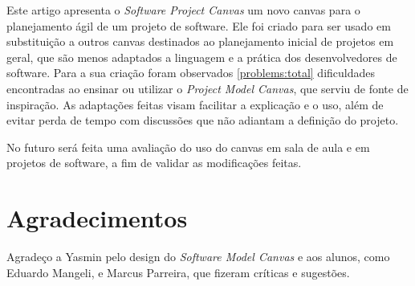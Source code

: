 \documentclass{article}
\begin{document}
Este artigo apresenta o \textit{Software Project Canvas} um novo canvas para o planejamento ágil de um projeto de software. Ele foi criado para ser usado em substituição a outros canvas destinados ao planejamento inicial de projetos em geral, que são menos adaptados a linguagem e a prática dos desenvolvedores de software. Para a sua  criação foram observados \ref{problems:total} dificuldades encontradas ao ensinar ou utilizar o \textit{Project Model Canvas}, que serviu de fonte de inspiração. As adaptações feitas visam facilitar a explicação e o uso, além de evitar perda de tempo com discussões que não adiantam a definição do projeto.

No futuro será feita uma avaliação do uso do canvas em sala de aula e em projetos de software, a fim de validar as modificações feitas.

\section*{Agradecimentos}

Agradeço a Yasmin pelo design do \textit{Software Model Canvas} e aos alunos, como Eduardo Mangeli, e Marcus Parreira, que fizeram críticas e sugestões.

\printbibliography
\end{document}
